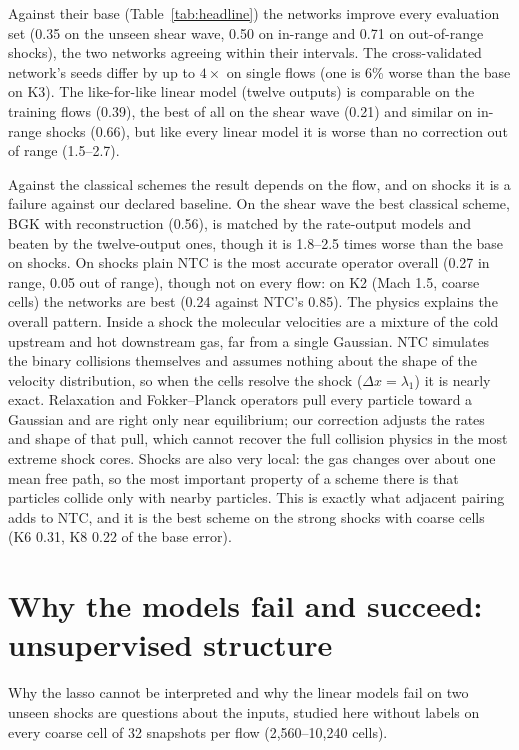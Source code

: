 \documentclass[10pt]{article}
\newcommand{\dx}{\Delta x}
\begin{document}
Against their base (Table~\ref{tab:headline}) the networks improve every evaluation set (0.35
on the unseen shear wave, 0.50 on in-range and 0.71 on out-of-range shocks), the two networks
agreeing within their intervals. The cross-validated network's seeds differ by up to $4\times$ on
single flows (one is 6\% worse than the base on K3). The like-for-like
linear model (twelve outputs) is comparable on the training flows (0.39), the best of all on the
shear wave (0.21) and similar on in-range shocks (0.66), but like every linear model it is worse than no
correction out of range (1.5--2.7).

Against the classical schemes the result depends on the flow, and on shocks it is a failure
against our declared baseline. On the shear wave the best classical scheme, BGK with
reconstruction (0.56), is matched by the rate-output models and beaten by the twelve-output ones,
though it is 1.8--2.5 times worse than the base on shocks. On shocks plain NTC is the most
accurate operator overall (0.27 in range, 0.05 out of range), though not on every flow: on K2
(Mach 1.5, coarse cells) the networks are best (0.24 against NTC's 0.85). The physics explains the overall pattern. Inside a shock the molecular velocities are a mixture
of the cold upstream and hot downstream gas, far from a single Gaussian. NTC simulates the binary
collisions themselves and assumes nothing about the shape of the velocity distribution, so when
the cells resolve the shock ($\dx=\lambda_1$) it is nearly exact. Relaxation and Fokker--Planck
operators pull every particle toward a Gaussian and are right only near equilibrium; our
correction adjusts the rates and shape of that pull, which cannot recover the full collision
physics in the most extreme shock cores.
Shocks are also very local: the gas changes over about one mean free path, so the most important
property of a scheme there is that particles collide only with nearby particles. This is exactly
what adjacent pairing adds to NTC, and it is the best scheme on the strong shocks with coarse
cells (K6 0.31, K8 0.22 of the base error).

\section{Why the models fail and succeed: unsupervised structure}\label{sec:why}

Why the lasso cannot be interpreted and why the linear models fail on two unseen shocks are
questions about the inputs, studied here without labels on every coarse cell of 32 snapshots per
flow (2,560--10,240 cells).
\end{document}
